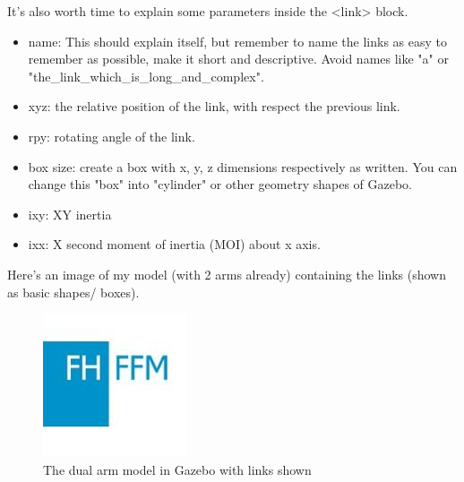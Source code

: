 \documentclass[pdftex,12pt,a4paper]{article}
\begin{document}
  \newpage
  It's also worth time to explain some parameters inside the <link> block.
  \begin{itemize}
  \item name: This should explain itself, but remember to name the links as easy to remember as possible, make it short and descriptive. Avoid names like "a" or "the\_link\_which\_is\_long\_and\_complex".
  \item xyz: the relative position of the link, with respect the previous link.
  \item rpy: rotating angle of the link.
  \item box size: create a box with x, y, z dimensions respectively as written. You can change this "box" into "cylinder" or other geometry shapes of Gazebo.
  \item ixy: XY inertia
  \item ixx: X second moment of inertia (MOI) about x axis.
  \end{itemize}
  Here's an image of my model (with 2 arms already) containing the links (shown as basic shapes/ boxes).
  \begin{figure}[h]
      \centering
      \includegraphics[width=0.5\linewidth]{image/FH-Frankfurt.jpg}
      \caption{The dual arm model in Gazebo with links shown}
      \label{fig:arm_gazebo_link}
  \end{figure}
  
\end{document}
